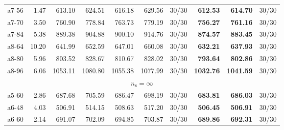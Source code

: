 \documentclass[aspectratio=1610]{beamer}
\begin{document}
\begin{frame}
\begin{table}[]
{\begin{tabular}{lrrrrrrrrr}
a7-56                                          & 1.47              & 613.10  & \multicolumn{1}{r|}{624.51}   & 616.18  & 629.56   & \multicolumn{1}{r|}{30/30} & \textbf{612.53}  & {\color[HTML]{FE0000} \textbf{614.70}}  & 30/30 \\
a7-70                                          & 3.50              & 760.90  & \multicolumn{1}{r|}{778.84}   & 763.73  & 779.19   & \multicolumn{1}{r|}{30/30} & \textbf{756.27}  & {\color[HTML]{FE0000} \textbf{761.16}}  & 30/30 \\
a7-84                                          & 5.38              & 889.38  & \multicolumn{1}{r|}{904.88}   & 900.10  & 914.76   & \multicolumn{1}{r|}{30/30} & \textbf{874.57}  & {\color[HTML]{FE0000} \textbf{883.45}}  & 30/30 \\
a8-64                                          & 10.20             & 641.99  & \multicolumn{1}{r|}{652.59}   & 647.01  & 660.08   & \multicolumn{1}{r|}{30/30} & \textbf{632.21}  & {\color[HTML]{FE0000} \textbf{637.93}}  & 30/30 \\
a8-80                                          & 5.96              & 803.52  & \multicolumn{1}{r|}{828.67}   & 810.67  & 828.02   & \multicolumn{1}{r|}{30/30} & \textbf{793.64}  & {\color[HTML]{FE0000} \textbf{802.86}}  & 30/30 \\
a8-96                                          & 6.06              & 1053.11 & \multicolumn{1}{r|}{1080.80}  & 1055.38 & 1077.99  & \multicolumn{1}{r|}{30/30} & \textbf{1032.76} & {\color[HTML]{FE0000} \textbf{1041.59}} & 30/30 \\ \hline
\multicolumn{10}{c}{$n_\mathrm{s} = \infty$}                                                                                                                                                                                        \\ \hline
a5-60                                          & 2.86              & 687.68  & \multicolumn{1}{r|}{705.59}   & 686.47  & 698.19   & \multicolumn{1}{r|}{30/30} & \textbf{683.81}  & {\color[HTML]{FE0000} \textbf{686.03}}  & 30/30 \\
a6-48                                          & 4.03              & 506.91  & \multicolumn{1}{r|}{514.15}   & 508.63  & 517.20   & \multicolumn{1}{r|}{30/30} & \textbf{506.45}  & {\color[HTML]{FE0000} \textbf{506.91}}  & 30/30 \\
a6-60                                          & 2.14              & 691.07  & \multicolumn{1}{r|}{702.09}   & 694.85  & 703.87   & \multicolumn{1}{r|}{30/30} & \textbf{689.86}  & {\color[HTML]{FE0000} \textbf{692.31}}  & 30/30 \\

\end{tabular}}
\end{table}
\end{frame}
\end{document}
